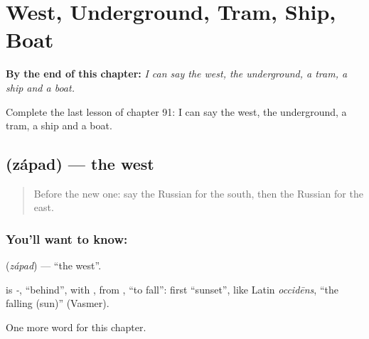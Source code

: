 
\chapter{West, Underground, Tram, Ship, Boat}
\label{ch:ru-west-underground-tram-ship-boat}

\begin{chapteropening}
\textbf{By the end of this chapter:} \emph{I can say the west, the underground, a tram, a ship and a boat.}

Complete the last lesson of chapter 91: I can say the west, the underground, a tram, a ship and a boat.
\end{chapteropening}

\section[\texorpdfstring{\ru{запад} (západ)}{запад (západ)}]{ (západ) — the west}

\label{lesson:RU-C91-west}



\begin{quote}
Before the new one: say the Russian for the south, then the Russian for the east.
\end{quote}

\subsection*{You'll want to know: }
\textbf{} (\emph{západ}) — \textquotedblleft{}the west\textquotedblright{}.

\begin{cousinweb}
\textbf{} is \emph{-}, \textquotedblleft{}behind\textquotedblright{}, with \emph{}, from \emph{}, \textquotedblleft{}to fall\textquotedblright{}: first \textquotedblleft{}sunset\textquotedblright{}, like Latin \emph{occidēns}, \textquotedblleft{}the falling (sun)\textquotedblright{} (Vasmer).
\end{cousinweb}

\begin{grammarlens}[title={What you've built}]
One more word for this chapter.
\end{grammarlens}

